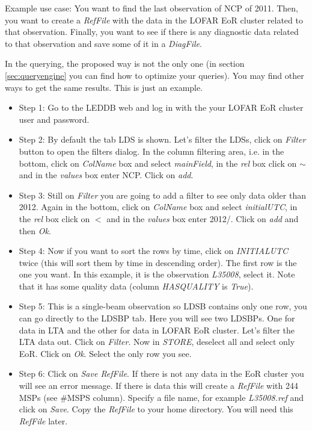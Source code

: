\documentclass[a4paper,11pt]{article}
\begin{document}
Example use case: You want to find the last observation of NCP of 2011. Then, you want to create a \textit{RefFile} with the data in the LOFAR EoR cluster related to that observation. Finally, you want to see if there is any diagnostic data related to that observation and save some of it in a \textit{DiagFile}. 

In the querying, the proposed way is not the only one (in section \ref{sec:queryengine} you can find how to optimize your queries). You may find other ways to get the same results. This is just an example.

\begin{itemize}
	\item Step 1: Go to the LEDDB web and log in with the your LOFAR EoR cluster user and password.
	
	\item Step 2: By default the tab LDS is shown. Let's filter the LDSs, click on \textit{Filter} button to open the filters dialog. In the column filtering area, i.e. in the bottom, click on \textit{ColName} box and select \textit{mainField}, in the \textit{rel} box click on $\sim$ and in the \textit{values} box enter NCP. Click on \textit{add}.
	
	\item Step 3: Still on \textit{Filter} you are going to add a filter to see only data older than 2012. Again in the bottom, click on \textit{ColName} box and select \textit{initialUTC}, in the \textit{rel} box click on $<$ and in the \textit{values} box enter 2012/. Click on \textit{add} and then \textit{Ok}.
	
	\item Step 4: Now if you want to sort the rows by time, click on \textit{INITIALUTC} twice (this will sort them by time in descending order). The first row is the one you want. In this example, it is the observation \textit{L35008}, select it. Note that it has some quality data (column \textit{HASQUALITY} is \textit{True}).
	
	\item Step 5: This is a single-beam observation so LDSB contains only one row, you can go directly to the LDSBP tab. Here you will see two LDSBPs. One for data in LTA and the other for data in LOFAR EoR cluster. Let's filter the LTA data out. Click on \textit{Filter}. Now in \textit{STORE}, deselect all and select only EoR. Click on \textit{Ok}. Select the only row you see.
	
	\item Step 6: Click on \textit{Save RefFile}. If there is not any data in the EoR cluster you will see an error message. If there is data this will create a \textit{RefFile} with 244 MSPs (see \#MSPS column). Specify a file name, for example \textit{L35008.ref} and click on \textit{Save}. Copy the \textit{RefFile} to your home directory. You will need this \textit{RefFile} later.
	

\end{itemize}
\end{document}
